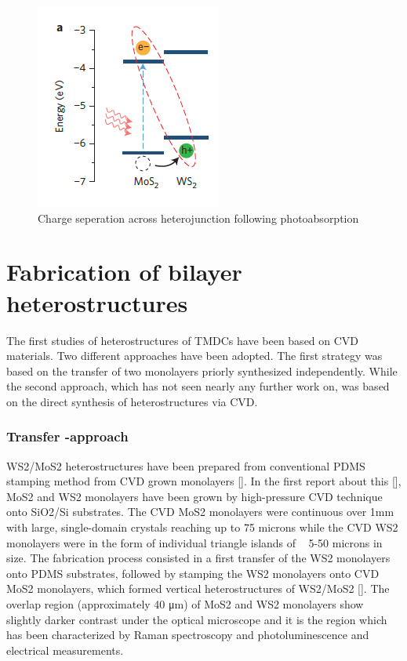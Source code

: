 \begin{figure}[h]
	\begin{center}
		\includegraphics[scale=1]{Heterostructures/HeterostructureChargeSeparationDiagram.png}
		\caption{Charge seperation across heterojunction following photoabsorption}
		\label{fig:HeterostructuresChargeSeperationDiagram}
	\end{center}
\end{figure}

\section{Fabrication of bilayer heterostructures}

The first studies of heterostructures of TMDCs have been based on CVD materials. Two different approaches have been adopted. The first strategy was based on the transfer of two monolayers priorly synthesized independently.  While the second approach, which has not seen nearly any further work on, was based on the direct synthesis of heterostructures via CVD. 

\subsubsection{Transfer -approach}

WS2/MoS2 heterostructures have been prepared from conventional PDMS stamping method from CVD grown monolayers []. In the first report about this [], MoS2 and WS2 monolayers have been grown by high-pressure CVD technique onto SiO2/Si substrates. The CVD MoS2 monolayers were continuous over 1mm with large, single-domain crystals reaching up to 75 microns while the CVD WS2 monolayers were in the form of individual triangle islands of ~ 5-50 microns in size. 
The fabrication process consisted in a first transfer of the WS2 monolayers onto PDMS substrates, followed by stamping the WS2 monolayers onto CVD MoS2 monolayers, which formed vertical heterostructures of WS2/MoS2 []. The overlap region (approximately 40 μm) of MoS2 and WS2 monolayers show slightly darker contrast under the optical microscope and it is the region which has been characterized by Raman spectroscopy and photoluminescence and electrical measurements.

